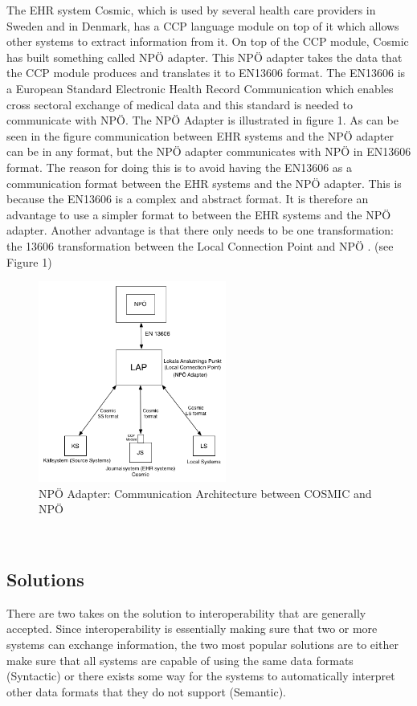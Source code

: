 \documentclass[14pt]{article}
\begin{document}
The EHR system Cosmic, which is used by several health care providers in Sweden and in Denmark, has a CCP language module on top of it which allows other systems to extract information from it. On top of the CCP module, Cosmic has built something called NPÖ adapter. This NPÖ adapter takes the data that the CCP module produces and translates it to \gls{EN13606} format. The \gls{EN13606} is a European Standard Electronic Health Record Communication which enables cross sectoral exchange of medical data and this standard is needed to communicate with NPÖ. The NPÖ Adapter is illustrated in figure 1. As can be seen in the figure communication between \gls{EHR} systems and the NPÖ adapter can be in any format, but the NPÖ adapter communicates with NPÖ in \gls{EN13606} format. The reason for doing this is to avoid having the \gls{EN13606} as a communication format between the \gls{EHR} systems and the NPÖ adapter. This is because the \gls{EN13606} is a complex and abstract format. It is therefore an advantage to use a simpler format to between the \gls{EHR} systems and the NPÖ adapter. Another advantage is that there only needs to be one transformation: the 13606 transformation between the Local Connection Point and NPÖ  \cite{ViktorJernelov}. (see Figure 1) 

\begin{figure}[h!]
  \caption{NPÖ Adapter: Communication Architecture between COSMIC and NPÖ}
  \centering
    \includegraphics[width=0.55\textwidth]{Images/npoNewAdapt}
\end{figure}\
\label{sec:npoIntervi}

\subsection{Solutions}
\label{sec:interopSolutions}
There are two takes on the solution to interoperability that are generally accepted.  Since interoperability is essentially making sure that two or more systems can exchange information, the two most popular solutions are to either make sure that all systems are capable of using the same data formats (Syntactic) or there exists some way for the systems to automatically interpret other data formats that they do not support (Semantic).
\end{document}
